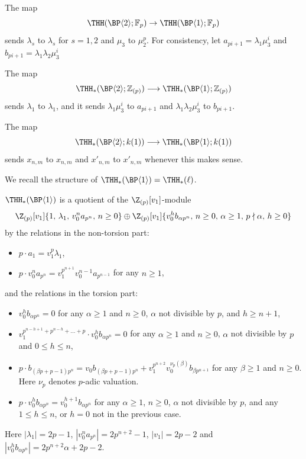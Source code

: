 The map 
\[ 
  \THH(\BP\langle 2\rangle ; \mathbb{F}_p)\to  \THH(\BP\langle 1\rangle ; \mathbb{F}_p) 
\]
sends $\lambda_s$ to $\lambda_s$ for $s=1,2$ and $\mu_3$ to $\mu_2^p$. For consistency, let $a_{pi+1}=\lambda_1\mu_3^{i}$ and $b_{pi+1}=\lambda_1\lambda_2\mu_3^{i}$ 

\begin{corollary}
  The map 
  \[ 
    \THH_*(\BP\langle 2\rangle ;\mathbb{Z}_{(p)})\longrightarrow \THH_*(\BP\langle 1\rangle ;\mathbb{Z}_{(p)})
  \]
  sends $\lambda_1$ to $\lambda_1$, and it sends $\lambda_1\mu_3^i$ to $a_{pi+1}$ and $\lambda_1\lambda_2\mu_3^i$ to $b_{pi+1}$. 

  The map 
  \[ 
    \THH_*(\BP\langle 2\rangle ;k(1))\longrightarrow \THH_*(\BP\langle 1\rangle ;k(1))
  \]
  sends $x_{n,m}$ to $x_{n,m}$ and $x'_{n,m}$ to $x'_{n,m}$ whenever this makes sense.
\end{corollary}



We recall the structure of $\THH_*(\BP \langle 1 \rangle) = \THH_*(\ell)$.

\begin{theorem}\label{thm:AHL}
  $\THH_*(\BP \langle 1 \rangle)$ is a quotient of the $\Z_{(p)}[v_1]$-module
  \begin{multline}
    \Z_{(p)}[v_1]\{1,\, \lambda_1,\, v_0^n a_{p^n},\,n\geq 0\} 
    \oplus \Z_{(p)}[v_1]\{v_0^h b_{\alpha p^n},\, n\geq 0,\, \alpha\geq 1,\, p\nmid \alpha,\, h \geq 0\}
  \end{multline}
  by the relations in the non-torsion part:
  \begin{itemize}
  \item $p\cdot a_1 = v_1^p \lambda_1$,
  \item $p\cdot v_0^n a_{p^n} = v_1^{p^{n+1}}v_0^{n-1} a_{p^{n-1}}$ for any $n\geq 1$,
  \end{itemize}
  and the relations in the torsion part:
  \begin{itemize}
  \item $v_0^{h} b_{\alpha p^n} = 0$ for any $\alpha \geq 1$ and $n \geq 0$, $\alpha$ not divisible by $p$, and $h \geq n + 1$,
  \item $v_1^{p^{n-h+1}+p^{n-h}+\dots+p }\cdot v_0^h b_{\alpha p^n} = 0$ for any $\alpha \geq 1$ and $n \geq 0$, $\alpha$ not divisible by $p$ and  $0 \leq h \leq n$,
  \item $p\cdot b_{(\beta p+p-1)p^n} = v_0 b_{(\beta p+p-1)p^n}+v_1^{p^{n+2}}v_0^{\nu_p(\beta)} b_{\beta p^{n+1}}$ for any $\beta \geq 1$ and $n \geq 0$. Here $\nu_p$ denotes $p$-adic valuation.
  \item $p\cdot v_0^h b_{\alpha p^n} = v_0^{h+1} b_{\alpha p^n}$ for any $\alpha \geq 1$, $n \geq 0$, $\alpha$ not divisible by $p$, and any $1 \leq h \leq n$, or $h=0$ not in the previous case.
  \end{itemize}
Here $|\lambda_1|=2p-1$, $|v_0^na_{p^n}|=2p^{n+2}-1$, $|v_1|=2p-2$ and $|v_0^hb_{\alpha p^n}|=2p^{n+2}\alpha+2p-2$.
\end{theorem}

